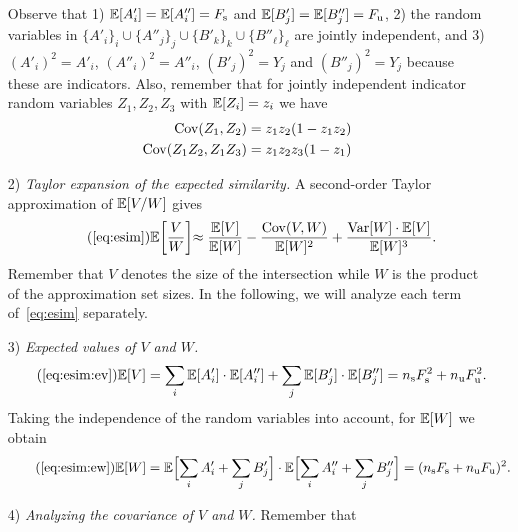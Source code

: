 \begin{itemize}
\begin{equation}
    \end{equation}
    Observe that 1) $\mathbb{E}[A'_i]=\mathbb{E}[A''_i]=F_\text{s}$ and $\mathbb{E}[B'_j]=\mathbb{E}[B''_j]
    =F_\text{u}$, 2) the random variables in $\{A'_i\}_i \cup \{A''_j\}_j \cup \{B'_k\}_k
    \cup \{B''_\ell\}_\ell$ are jointly independent, and 3) $(A'_i)^2=A'_i$,
    $(A''_i)^2=A''_i$, $(B'_j)^2=Y_j$ and $(B''_j)^2=Y_j$ because these are
    indicators. Also, remember that for jointly independent indicator random
    variables $Z_1, Z_2, Z_3$ with $\mathbb{E}[Z_i] = z_i$ we have
    \begin{align}
      {\mathrm{Cov}}(Z_1, Z_2)
        &= z_1 z_2 (1 - z_1 z_2) \label{eq:ag:covariance_general_2} \\
      {\mathrm{Cov}}(Z_1 Z_2, Z_1 Z_3 )
        &= z_1 z_2 z_3 (1 - z_1) \label{eq:ag:covariance_general_1}
    \end{align}
  \item[2)] {\em Taylor expansion of the expected similarity.}
    A second-order Taylor approximation of $\mathbb{E}[V/W]$ gives
    \begin{align}
      \tag{\ref{eq:esim}}
      \Expct\biggl[\frac{V}{W}\biggl]
        \approx \frac{\Expct[V]}{\Expct[W]} -
        \frac{\Cov(V,W)}{\Expct[W]^2} +
        \frac{\Var[W] \cdot \Expct[V]}{\Expct[W]^3}.
    \end{align}
    Remember that $V$ denotes the size of the intersection while $W$ is the
    product of the approximation set sizes. In the following, we will
    analyze each term of~\eqref{eq:esim} separately.
  \item[3)] {\em Expected values of $V$ and $W$.}
    \begin{align*}
      \tag{\ref{eq:esim:ev}}
      \Expct[V] = \sum_i \Expct[A'_i] \cdot \Expct[A''_i] +
        \sum_j \Expct[B'_j] \cdot \Expct[B''_j] = \g\FG^2 + \b\FB^2.
    \end{align*}
    Taking the independence of the random variables into account, for
    $\mathbb{E}[W]$ we obtain
    \begin{align*}
      \tag{\ref{eq:esim:ew}}
      \Expct[W]
        = \Expct\Bigl[\sum_i A'_i + \sum_j B'_j\Bigr] \cdot
          \Expct\Bigl[\sum_i A''_i + \sum_j B''_j\Bigr]
        = ( \g \FG + \b \FB )^2.
    \end{align*}
  \item[4)] {\em Analyzing the covariance of $V$ and $W$.}
    Remember that
    \begin{align}

\end{align}
\end{itemize}
